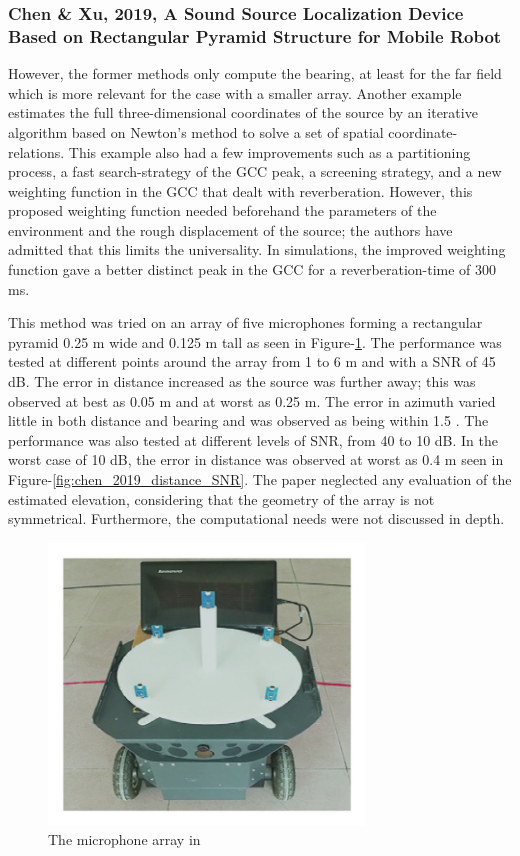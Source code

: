 \documentclass[notitlepage]{report}
\begin{document}
\subsubsection{Chen \& Xu, 2019, A Sound Source Localization Device Based on Rectangular Pyramid Structure for Mobile Robot}

However, the former methods only compute the bearing, at least for the far field which is more relevant for the case with a smaller array. Another example \cite{chen_sound_2019} estimates the full three-dimensional coordinates of the source by an iterative algorithm based on Newton's method to solve a set of spatial coordinate-relations. This example also had a few improvements such as a partitioning process, a fast search-strategy of the GCC peak, a screening strategy, and a new weighting function in the GCC that dealt with reverberation. However, this proposed weighting function needed beforehand the parameters of the environment and the rough displacement of the source; the authors have admitted that this limits the universality. In simulations, the improved weighting function gave a better distinct peak in the GCC for a reverberation-time of 300 \si{ms}. 

This method was tried on an array of five microphones forming a rectangular pyramid 0.25 \si{m} wide and 0.125 \si{m} tall as seen in Figure-\ref{fig:chen_2019_array}. The performance was tested at different points around the array from 1 to 6 \si{m} and with a SNR of 45 \si{dB}. The error in distance increased as the source was further away; this was observed at best as 0.05 \si{m} and at worst as 0.25 \si{m}. The error in azimuth varied little in both distance and bearing and was observed as being within 1.5 \si{\deg}. The performance was also tested at different levels of SNR, from 40 to 10 \si{dB}. In the worst case of 10 \si{dB}, the error in distance was observed at worst as 0.4 \si{m} seen in Figure-\ref{fig:chen_2019_distance_SNR}. The paper neglected any evaluation of the estimated elevation, considering that the geometry of the array is not symmetrical. Furthermore, the computational needs were not discussed in depth.

\begin{figure}[H]
\includegraphics[width=0.75\textwidth]{./chen_2019/array.jpg}
\centering
\caption{The microphone array in \cite{chen_sound_2019}}
\label{fig:chen_2019_array}
\centering
\end{figure}
\end{document}
